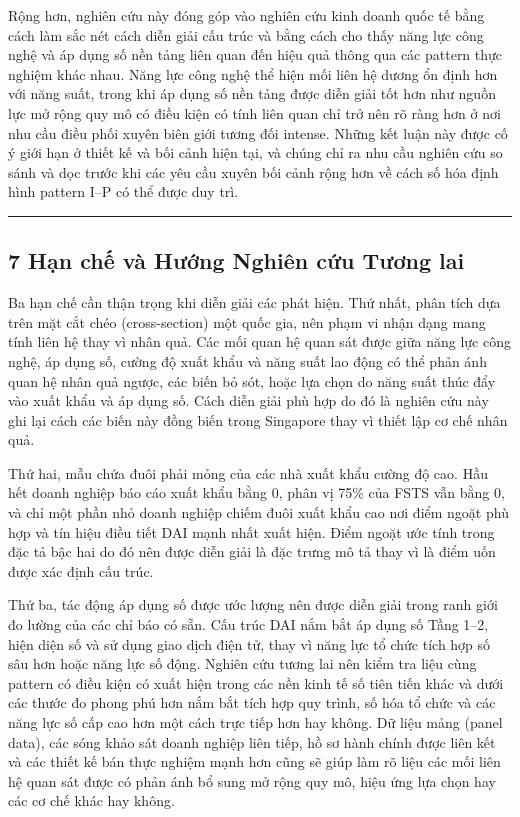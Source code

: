 \documentclass[12pt,a4paper]{article}
\begin{document}
Rộng hơn, nghiên cứu này đóng góp vào nghiên cứu kinh doanh quốc tế bằng
cách làm sắc nét cách diễn giải cấu trúc và bằng cách cho thấy năng lực
công nghệ và áp dụng số nền tảng liên quan đến hiệu quả thông qua các
pattern thực nghiệm khác nhau. Năng lực công nghệ thể hiện mối liên hệ
dương ổn định hơn với năng suất, trong khi áp dụng số nền tảng được diễn
giải tốt hơn như nguồn lực mở rộng quy mô có điều kiện có tính liên quan
chỉ trở nên rõ ràng hơn ở nơi nhu cầu điều phối xuyên biên giới tương
đối intense. Những kết luận này được cố ý giới hạn ở thiết kế và bối
cảnh hiện tại, và chúng chỉ ra nhu cầu nghiên cứu so sánh và dọc trước
khi các yêu cầu xuyên bối cảnh rộng hơn về cách số hóa định hình pattern
I--P có thể được duy trì.

\begin{center}\rule{0.5\linewidth}{0.5pt}\end{center}

\hypertarget{7-hux1ea1n-chux1ebf-vuxe0-hux1b0ux1edbng-nghiuxean-cux1ee9u-tux1b0ux1a1ng-lai}{%
\subsection{7 Hạn chế và Hướng Nghiên cứu Tương
lai}\label{7-hux1ea1n-chux1ebf-vuxe0-hux1b0ux1edbng-nghiuxean-cux1ee9u-tux1b0ux1a1ng-lai}}

Ba hạn chế cần thận trọng khi diễn giải các phát hiện. Thứ nhất, phân
tích dựa trên mặt cắt chéo (cross-section) một quốc gia, nên phạm vi
nhận dạng mang tính liên hệ thay vì nhân quả. Các mối quan hệ quan sát
được giữa năng lực công nghệ, áp dụng số, cường độ xuất khẩu và năng
suất lao động có thể phản ánh quan hệ nhân quả ngược, các biến bỏ sót,
hoặc lựa chọn do năng suất thúc đẩy vào xuất khẩu và áp dụng số. Cách
diễn giải phù hợp do đó là nghiên cứu này ghi lại cách các biến này đồng
biến trong Singapore thay vì thiết lập cơ chế nhân quả.

Thứ hai, mẫu chứa đuôi phải mỏng của các nhà xuất khẩu cường độ cao. Hầu
hết doanh nghiệp báo cáo xuất khẩu bằng 0, phân vị 75\% của FSTS vẫn
bằng 0, và chỉ một phần nhỏ doanh nghiệp chiếm đuôi xuất khẩu cao nơi
điểm ngoặt phù hợp và tín hiệu điều tiết DAI mạnh nhất xuất hiện. Điểm
ngoặt ước tính trong đặc tả bậc hai do đó nên được diễn giải là đặc
trưng mô tả thay vì là điểm uốn được xác định cấu trúc.

Thứ ba, tác động áp dụng số được ước lượng nên được diễn giải trong ranh
giới đo lường của các chỉ báo có sẵn. Cấu trúc DAI nắm bắt áp dụng số
Tầng 1--2, hiện diện số và sử dụng giao dịch điện tử, thay vì năng lực
tổ chức tích hợp số sâu hơn hoặc năng lực số động. Nghiên cứu tương lai
nên kiểm tra liệu cùng pattern có điều kiện có xuất hiện trong các nền
kinh tế số tiên tiến khác và dưới các thước đo phong phú hơn nắm bắt
tích hợp quy trình, số hóa tổ chức và các năng lực số cấp cao hơn một
cách trực tiếp hơn hay không. Dữ liệu mảng (panel data), các sóng khảo
sát doanh nghiệp liên tiếp, hồ sơ hành chính được liên kết và các thiết
kế bán thực nghiệm mạnh hơn cũng sẽ giúp làm rõ liệu các mối liên hệ
quan sát được có phản ánh bổ sung mở rộng quy mô, hiệu ứng lựa chọn hay
các cơ chế khác hay không.
\end{document}

